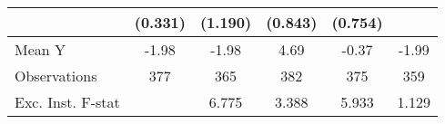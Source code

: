{\begin{tabular}{l*{5}{c}}
            &     (0.331)         &     (1.190)         &     (0.843)         &     (0.754)         &                     \\
\midrule
Mean Y      &       -1.98         &       -1.98         &        4.69         &       -0.37         &       -1.99         \\
Observations&         377         &         365         &         382         &         375         &         359         \\
Exc. Inst. F-stat&                     &       6.775         &       3.388         &       5.933         &       1.129         \\
\bottomrule
\end{tabular}
}
